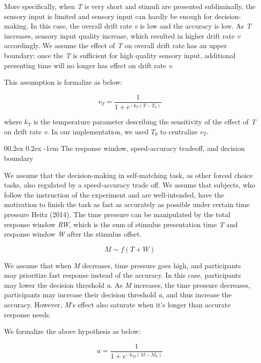 \documentclass[
  english,
  man,floatsintext]{apa6}
\makeatletter
\let\oldparagraph\paragraph
\renewcommand{\paragraph}{
    \@ifstar
      \xxxParagraphStar
      \xxxParagraphNoStar
  }
\newcommand{\xxxParagraphStar}[1]{\oldparagraph*{#1}\mbox{}}
\newcommand{\xxxParagraphNoStar}[1]{\oldparagraph{#1}\mbox{}}
\renewcommand{\paragraph}{\@startsection{paragraph}{4}{\parindent}%
  {0\baselineskip \@plus 0.2ex \@minus 0.2ex}%
  {-1em}%
  {\normalfont\normalsize\bfseries\itshape\typesectitle}}
\makeatother
\begin{document}
More specifically, when \emph{T} is very short and stimuli are presented subliminally, the sensory input is limited and sensory input can hardly be enough for decision-making. In this case, the overall drift rate \emph{v} is low and the accuracy is low. As \emph{T} increases, sensory input quality increase, which resulted in higher drift rate \emph{v} accordingly. We assume the effect of \emph{T} on overall drift rate has an upper boundary: once the \emph{T} is sufficient for high quality sensory input, additional presenting time will no longer has effect on drift rate \emph{v}.

This assumption is formalize as below:

\[v_T = \frac{1}{1 + e^{-k_T(T - T_0)}}\]

where \(k_T\) is the temperature parameter describing the sensitivity of the effect of \emph{T} on drift rate \emph{v}. In our implementation, we used \(T_0\) to centralize \(v_T\).

\paragraph{The response window, speed-accuracy tradeoff, and decision boundary}\label{the-response-window-speed-accuracy-tradeoff-and-decision-boundary}

We assume that the decision-making in self-matching task, as other forced choice tasks, also regulated by a speed-accuracy trade off. We assume that subjects, who follow the instruction of the experiment and are well-intended, have the motivation to finish the task as fast as accurately as possible under certain time pressure Heitz (2014). The time pressure can be manipulated by the total response window \emph{RW}, which is the sum of stimulus presentation time \emph{T} and response window \emph{W} after the stimulus offset.

\[M \sim f(T + W)\]

We assume that when \emph{M} decreases, time pressure goes high, and participants may prioritize fast response instead of the accuracy. In this case, participants may lower the decision threshold \emph{a}. As \emph{M} increases, the time pressure decreases, participants may increase their decision threshold \emph{a}, and thus increase the accuracy. However, \emph{M}'s effect also saturate when it's longer than accurate response needs.

We formalize the above hypothesis as below:

\[a = \frac{1}{1 + e^{-k_M(M - M_0)}}\]
\end{document}
